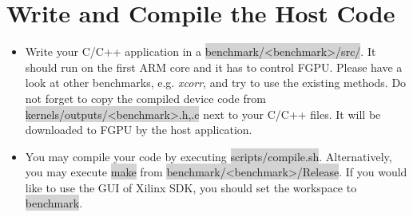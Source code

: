 \documentclass[11pt]{article}
\begin{document}
\section{Write and Compile the Host Code}
\begin{itemize}
  \item Write your C/C++ application in a \colorbox{lightGray}{benchmark/<benchmark>/src/}.
    It should run on the first ARM core and it has to control FGPU.
    Please have a look at other benchmarks, e.g. \emph{xcorr}, and try to use the existing methods.
    Do not forget to copy the compiled device code from \colorbox{lightGray}{kernels/outputs/<benchmark>{.h,.c}} next to your C/C++ files.
    It will be downloaded to FGPU by the host application.
  \item You may compile your code by executing \colorbox{lightGray}{scripts/compile.sh}.
    Alternatively, you may execute \colorbox{lightGray}{make} from \colorbox{lightGray}{benchmark/<benchmark>/Release}.
    If you would like to use the GUI of Xilinx SDK, you should set the workspace to \colorbox{lightGray}{benchmark}.
\end{itemize}
\end{document}
